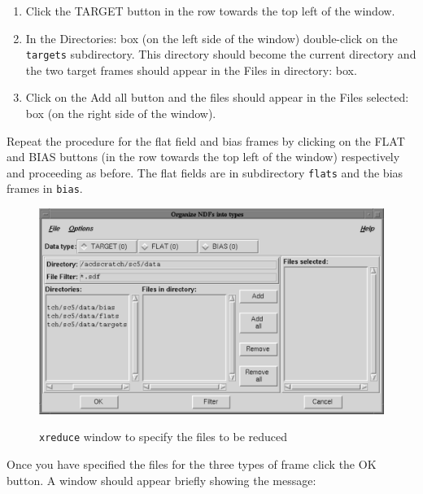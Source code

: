 \documentclass[twoside,11pt]{starlink}
\begin{document}
\begin{enumerate}
  \begin{enumerate}

    \item Click the \textsf{TARGET} button in the row towards the top left
     of the window.

    \item In the \textsf{Directories:} box (on the left side of the window)
     double-click on the \texttt{targets} subdirectory.  This directory
     should become the current directory and the two target frames should
     appear in the \textsf{Files in directory:} box.

    \item Click on the \textsf{Add all} button and the files should appear
     in the \textsf{Files selected:} box (on the right side of the window).

  \end{enumerate}

   Repeat the procedure for the flat field and bias frames by clicking
   on the \textsf{FLAT} and \textsf{BIAS} buttons (in the row towards the top
   left of the window) respectively and proceeding as before.  The flat
   fields are in subdirectory \texttt{flats} and the bias frames in \texttt{bias}.

  \begin{figure}[htbp]
     \centering
      \includegraphics[totalheight=3in]{sc5_organisendftypes}
      \begin{quote}
      \caption{\texttt{xreduce} window to specify the files to be reduced
      \label{ORGANISENDFTYPES} }
      \end{quote}
  \end{figure}

   Once you have specified the files for the three types of frame click
   the \textsf{OK} button.  A window should appear briefly showing the message:


\end{enumerate}
\end{document}
